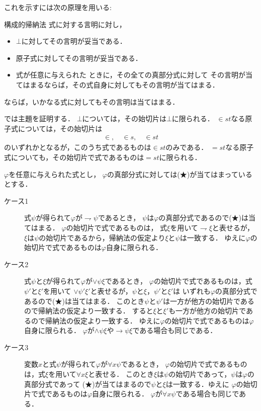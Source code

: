 \documentclass[a4j,10.5pt,oneside,openany]{jsbook}
\begin{document}
	これを示すには次の原理を用いる:
	\begin{itembox}[l]{構成的帰納法}
		式に対する言明に対し，
		\begin{itemize}
			\item $\bot$に対してその言明が妥当である．
			\item 原子式に対してその言明が妥当である．
			\item 式が任意に与えられた\footnotemark
				ときに，その全ての真部分式に対して
				その言明が当てはまるならば，その式自身に対してもその言明が当てはまる．
		\end{itemize}
		ならば，いかなる式に対してもその言明は当てはまる．
	\end{itembox}
	
	
	では主題を証明する．
	$\bot$については，その始切片は$\bot$に限られる．
	$\in st$なる原子式については，その始切片は
	\begin{align}
		\in, \quad \in s, \quad \in st
	\end{align}
	のいずれかとなるが，このうち式であるものは$\in st$のみである．
	$=st$なる原子式についても，その始切片で式であるものは$=st$に限られる．
	
	$\varphi$を任意に与えられた式とし，
	$\varphi$の真部分式に対しては(★)が当てはまっているとする．
	\begin{description}
		\item[ケース1] 式$\psi$が得られて$\varphi$が$\rightharpoondown \psi$であるとき，
			$\psi$は$\varphi$の真部分式であるので(★)は当てはまる．
			$\varphi$の始切片で式であるものは，
			式$\xi$を用いて$\rightharpoondown \xi$と表せるが，
			$\xi$は$\psi$の始切片であるから，帰納法の仮定より$\xi$と$\psi$は一致する．
			ゆえに$\varphi$の始切片で式であるものは$\varphi$自身に限られる．
			
		\item[ケース2] 式$\psi$と$\xi$が得られて$\varphi$が$\vee \psi \xi$であるとき，
			$\varphi$の始切片で式であるものは，式$\psi'$と$\xi'$を用いて
			$\vee \psi' \xi'$と表せるが，$\psi$と$\xi$，$\psi'$と$\xi'$は
			いずれも$\varphi$の真部分式であるので(★)は当てはまる．
			このとき$\psi$と$\psi'$は一方が他方の始切片であるので帰納法の仮定より一致する．
			すると$\xi$と$\xi'$も一方が他方の始切片であるので帰納法の仮定より一致する．
			ゆえに$\varphi$の始切片で式であるものは$\varphi$自身に限られる．
			$\varphi$が$\wedge \psi \xi$や$\rightarrow \psi \xi$である場合も同じである．
			
		\item[ケース3] 変数$x$と式$\psi$が得られて$\varphi$が$\forall x \psi$であるとき，
			$\varphi$の始切片で式であるものは，式$\xi$を用いて$\forall x \xi$と表せる．
			このとき$\xi$は$\psi$の始切片であって，$\psi$は$\varphi$の真部分式であって
			(★)が当てはまるので$\psi$と$\xi$は一致する．ゆえに
			$\varphi$の始切片で式であるものは$\varphi$自身に限られる．
			$\varphi$が$\forall x \psi$である場合も同じである．
	\end{description}
	
\end{document}
